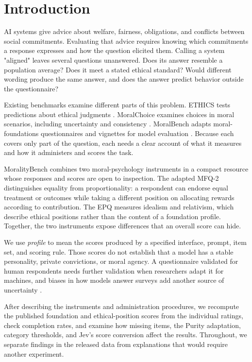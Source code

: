 \documentclass[11pt]{article}
\begin{document}
\section{Introduction}
AI systems give advice about welfare, fairness, obligations, and conflicts between social commitments. Evaluating that advice requires knowing which commitments a response expresses and how the question elicited them. Calling a system "aligned" leaves several questions unanswered. Does its answer resemble a population average? Does it meet a stated ethical standard? Would different wording produce the same answer, and does the answer predict behavior outside the questionnaire?

Existing benchmarks examine different parts of this problem. ETHICS tests predictions about ethical judgments \cite{hendrycks}. MoralChoice examines choices in moral scenarios, including uncertainty and consistency \cite{scherrer}. MoralBench adapts moral-foundations questionnaires and vignettes for model evaluation \cite{ji}. Because each covers only part of the question, each needs a clear account of what it measures and how it administers and scores the task.

MoralityBench combines two moral-psychology instruments in a compact resource whose responses and scores are open to inspection. The adapted MFQ-2 distinguishes equality from proportionality: a respondent can endorse equal treatment or outcomes while taking a different position on allocating rewards according to contribution. The EPQ measures idealism and relativism, which describe ethical positions rather than the content of a foundation profile. Together, the two instruments expose differences that an overall score can hide.

We use \emph{profile} to mean the scores produced by a specified interface, prompt, item set, and scoring rule. Those scores do not establish that a model has a stable personality, private convictions, or moral agency. A questionnaire validated for human respondents needs further validation when researchers adapt it for machines, and biases in how models answer surveys add another source of uncertainty \cite{dominguez}.

After describing the instruments and administration procedures, we recompute the published foundation and ethical-position scores from the individual ratings, check completion rates, and examine how missing items, the Purity adaptation, category thresholds, and Jev's score conversion affect the results. Throughout, we separate findings in the released data from explanations that would require another experiment.
\end{document}
